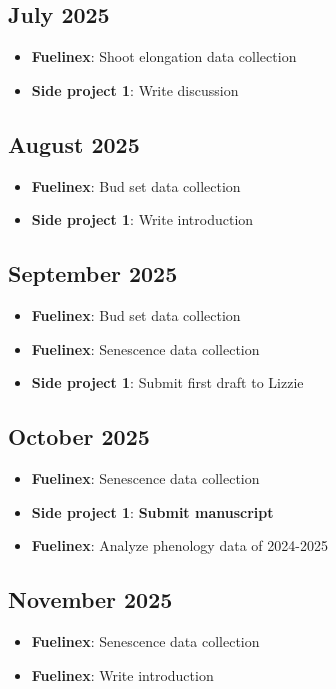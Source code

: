 \documentclass{article}
\begin{document}
\subsection*{July 2025}
\begin{itemize}
    \item \textbf{Fuelinex}: Shoot elongation data collection
    \item \textbf{Side project 1}: Write discussion
\end{itemize}

\subsection*{August 2025}
\begin{itemize}
    \item \textbf{Fuelinex}: Bud set data collection
    \item \textbf{Side project 1}: Write introduction
\end{itemize}

\subsection*{September 2025}
\begin{itemize}
    \item \textbf{Fuelinex}: Bud set data collection
    \item \textbf{Fuelinex}: Senescence data collection
    \item \textbf{Side project 1}: Submit first draft to Lizzie
\end{itemize}

\subsection*{October 2025}
\begin{itemize}
    \item \textbf{Fuelinex}: Senescence data collection
    \item \textbf{Side project 1}: \textbf{Submit manuscript}
    \item \textbf{Fuelinex}: Analyze phenology data of 2024-2025
\end{itemize}

\subsection*{November 2025}
\begin{itemize}
    \item \textbf{Fuelinex}: Senescence data collection
    \item \textbf{Fuelinex}: Write introduction
\end{itemize}
\end{document}
